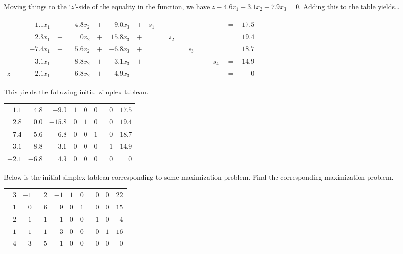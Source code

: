 \documentclass[12pt,letterpaper]{exam}
\begin{document}
\begin{questions}
{\begin{table}[!ht]
\begin{tabular}{rrrrrrrrrrrrrrr}
	\end{tabular}
	\end{table} \par
Moving things to the `$z$'-side of the equality in the function, we have $z - 4.6x_1 - 3.1x_2 - 7.9x_3= 0$. Adding this to the table yields\dots \par
	\begin{table}[!ht]
	\centering
	\begin{tabular}{rrrrrrrrrrrrrrrrr}
	&& $1.1x_1$ & $+$ & $4.8x_2$ & $+$ & $-9.0x_3$ & $+$ & $s_1$ &  &  &  &  &  &  & $=$ & $17.5$ \\
	&& $2.8x_1$ & $+$ & $0x_2$ & $+$ & $15.8x_3$ & $+$ &  &  & $s_2$ &  &  &  &  & $=$ & $19.4$ \\
	&& $-7.4x_1$ & $+$ & $5.6x_2$ & $+$ & $-6.8x_3$ & $+$ &  &  &  &  & $s_3$ &  &  & $=$ & $18.7$ \\
	&& $3.1x_1$ & $+$ & $8.8x_2$ & $+$ & $-3.1x_3$ & $+$ &  &  &  &  &  &  & $-s_4$ & $=$ & $14.9$ \\ 
	$z$ & $-$ & $2.1x_1$ & $+$ & $-6.8x_2$ & $+$ & $4.9x_3$ & &  &  &  &  &  &  & & $=$ & $0$ \\ 
	\end{tabular}
	\end{table} \par
This yields the following initial simplex tableau: \par
	\begin{table}[!ht]
	\centering
	\begin{tabular}{rrrrrrr|r}
	$1.1$ & $4.8$ & $-9.0$ & $1$ & $0$ & $0$ & $0$ & $17.5$ \\
	$2.8$ & $0.0$ & $-15.8$ & $0$ & $1$ & $0$ & $0$ & $19.4$ \\
	$-7.4$ & $5.6$ & $-6.8$ & $0$ & $0$ & $1$ & $0$ & $18.7$ \\
	$3.1$ & $8.8$ & $-3.1$ & $0$ & $0$ & $0$ & $-1$ & $14.9$ \\ \hline
	$-2.1$ & $-6.8$ & $4.9$ & $0$ & $0$ & $0$ & $0$ & $0$ \\
	\end{tabular}
	\end{table}
}



\newpage
\question[10] Below is the initial simplex tableau corresponding to some maximization problem. Find the corresponding maximization problem. \par
	\begin{table}[!ht]
	\centering
	\begin{tabular}{rrrrrrrrr}
	$3$ & $-1$ & $2$ & $-1$ & $1$ & $0$ & $0$ & $0$ & $22$ \\
	$1$ & $0$ & $6$ & $9$ & $0$ & $1$ & $0$ & $0$ & $15$ \\
	$-2$ & $1$ & $1$ & $-1$ & $0$ & $0$ & $-1$ & $0$ & $4$ \\
	$1$ & $1$ & $1$& $3$ & $0$ & $0$& $0$ & $1$ & $16$ \\
	$-4$ & $3$ & $-5$ & $1$ & $0$ & $0$ & $0$ & $0$ & $0$
	\end{tabular}
	\end{table} 


\end{questions}
\end{document}
